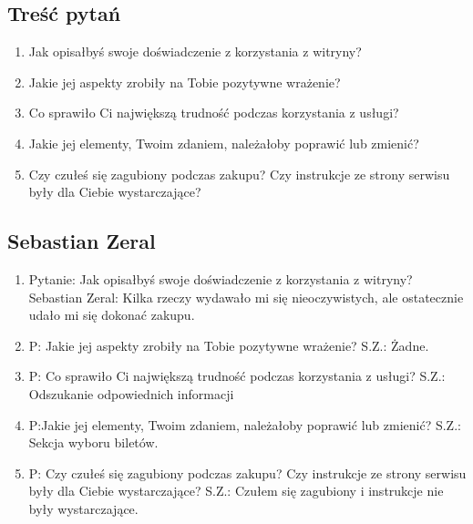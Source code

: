 \documentclass{article}
\begin{document}
\subsection{Treść pytań}
\begin{enumerate}
\item Jak opisałbyś swoje doświadczenie z korzystania z witryny?
\item Jakie jej aspekty zrobiły na Tobie pozytywne wrażenie?
\item Co sprawiło Ci największą trudność podczas korzystania z usługi?
\item Jakie jej elementy, Twoim zdaniem, należałoby poprawić lub zmienić?
\item Czy czułeś się zagubiony podczas zakupu? Czy instrukcje ze strony serwisu były dla Ciebie wystarczające?
\end{enumerate}

\subsection{Sebastian Zeral}
\begin{enumerate}
\item Pytanie: Jak opisałbyś swoje doświadczenie z korzystania z witryny? \newline
Sebastian Zeral: Kilka rzeczy wydawało mi się nieoczywistych, ale ostatecznie udało mi się dokonać zakupu.
\item P: Jakie jej aspekty zrobiły na Tobie pozytywne wrażenie? \newline
S.Z.: Żadne.
\item P: Co sprawiło Ci największą trudność podczas korzystania z usługi? \newline
S.Z.: Odszukanie odpowiednich informacji
\item P:Jakie jej elementy, Twoim zdaniem, należałoby poprawić lub zmienić? \newline
S.Z.: Sekcja wyboru biletów.
\item P: Czy czułeś się zagubiony podczas zakupu? Czy instrukcje ze strony serwisu były dla Ciebie wystarczające? \newline
S.Z.: Czułem się zagubiony i instrukcje nie były wystarczające.
\end{enumerate}
\end{document}
